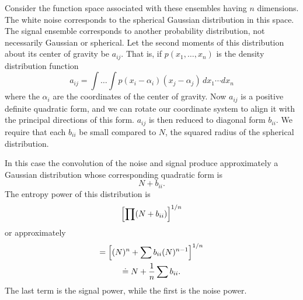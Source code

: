 Consider the function space associated with these ensembles having $n$
dimensions.  The white noise corresponds to the spherical Gaussian
distribution in this space.  The signal ensemble corresponds to another
probability distribution, not necessarily Gaussian or spherical.  Let the
second moments of this distribution about its center of gravity be
$a_{ij}$.  That is, if $p(x_1,\dots,x_n)$ is the density distribution
function
$$
a_{ij}=\int\dots\int p(x_i-\alpha_i)(x_j-\alpha_j)\,dx_1\dotsm dx_n
$$
where the $\alpha_i$ are the coordinates of the center of gravity.  Now
$a_{ij}$ is a positive definite quadratic form, and we can rotate our
coordinate system to align it with the principal directions of this form.
$a_{ij}$ is then reduced to diagonal form $b_{ii}$.  We require that each
$b_{ii}$ be small compared to $N$, the squared radius of the spherical
distribution.

In this case the convolution of the noise and signal produce approximately
a Gaussian distribution whose corresponding quadratic form is
$$
N+b_{ii}.
$$
The entropy power of this distribution is
$$
\Bigl[\prod(N+b_{ii})\Bigr]^{1/n}
$$
or approximately
\begin{gather*}
=\Bigl[(N)^n+\sum b_{ii}(N)^{n-1}\Bigr]^{1/n}\\
\doteq N+\frac1n\sum b_{ii}.
\end{gather*}
The last term is the signal power, while the first is the noise power.

